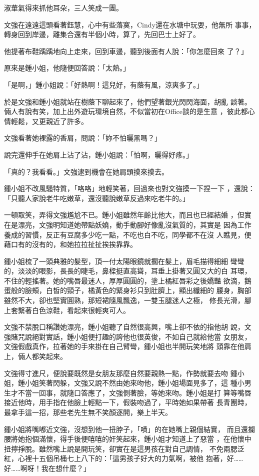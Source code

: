 淑華氣得來抓他耳朵，三人笑成一團。

文強在遠遠這頭看著鈺慧，心中有些落寞，Cindy還在水塘中玩耍，他無所
事事，轉身回到岸邊，離集合還有半個小時，算了，先回巴士上好了。

他提著布鞋踽踽地向上走來，回到車邊，聽到後面有人說：「你怎麼回來
了？」

原來是鍾小姐，他隨便回答說：「太熱。」

「是啊，」鍾小姐說：「好熱啊！這兒好，有蔭有風，涼爽多了。」

於是文強和鍾小姐就站在樹蔭下聊起來了，他們望著銀光閃閃海面，胡亂
談著。倆人有說有笑，加上出外遊玩環境自然，不似當初在Office談的是生意
，彼此都心情輕鬆，又更親近了許多。

文強看著她裸露的香肩，問說：「妳不怕曬黑嗎？」

說完還伸手在她肩上沾了沾，鍾小姐說：「怕啊，曬得好疼。」

「真的？我看看。」文強逮到機會在她肩頭摸來摸去。

鍾小姐不改風騷特質，「咯咯」地輕笑著，回過來也對文強摸一下捏一下
，還說：「只聽人家說老牛吃嫩草，還沒聽說嫩草反過來吃老牛的。」

一頓取笑，弄得文強尷尬不已。鍾小姐雖然年齡比他大，而且也已經結婚
，但實在是漂亮，文強明知道她帶點妖嬈，動手動腳好像亂沒氣質的，其實是
因為工作養成的習慣，反正有豆腐多少吃一點，不吃也白不吃，同學都不在沒
人瞧見，便藉口有的沒有的，和她拉拉扯扯挨挨靠靠。

鍾小姐梳了一頭典雅的髮型，頂一付太陽眼鏡就擱在髮上，眉毛描得細細
彎彎的，淡淡的眼影，長長的睫毛，鼻樑挺直高聳，耳垂上掛著又圓又大的白
耳環，不住的輕搖著。她的嘴唇最迷人，厚厚圓圓的，塗上橘紅唇彩之後嬌豔
欲滴，鵝蛋般的臉頰，白皙的頸子，橘黃色的緊身衫只到肚臍上，顯出纖細的
腰身，胸部雖然不大，卻也堅實圓熟，那短裙隨風飄逸，一雙玉腿迷人之極，
修長光滑，腳上套繫著白色涼鞋，看起來很輕爽可人。

文強不禁脫口稱讚她漂亮，鍾小姐聽了自然很高興，嘴上卻不依的指他胡
說，文強賭咒說絕對實話，鍾小姐便打趣的誇他也很英俊，不如自己就給他當
女朋友，文強假戲真作，拉著她的手來掛在自己臂彎，鍾小姐也半開玩笑地將
頭靠在他肩上，倆人都笑起來。

文強得寸進尺，便說要既然是女朋友那麼自然要親熱一點，作勢就要去吻
鍾小姐，鍾小姐笑著閃躲，文強又說不然由她來吻他，鍾小姐場面見多了，這
種小男生才不當一回事，就隨口答應了，文強側著臉，等她來吻。鍾小姐是打
算等嘴唇接近他時，用手指在他臉上輕點一下，假裝吻過了，平時她如果帶著
長青團時，最拿手這一招，那些老先生無不笑顏逐開，樂上半天。

鍾小姐將嘴嘟近文強，沒想到他一扭脖子，「嘖」的在她嘴上親個結實，
而且還攔腰將她抱個滿懷，得手後便嘻嘻的奸笑起來，鍾小姐才知道上了惡當
，在他懷中扭擰掙脫。雖然嘴上說是開玩笑，卻實在是這男孩在對自己調情，
不免兩腮泛紅，心裡十五個吊桶七上八下的：「這男孩子好大的力氣啊，被他
抱著，好……好……啊呀！我在想什麼？」

